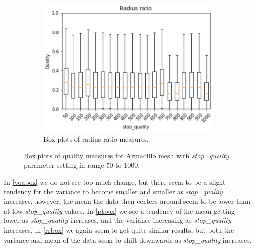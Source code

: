 \begin{figure}
\begin{subfigure}[b]{0.49\linewidth}
		\centering
		\includegraphics[width=\linewidth]{Materials/E1/rrbox}
		\caption{Box plots of radius ratio measures.}
		\label{rrbox}
	\end{subfigure}
	\caption{Box plots of quality measures for Armadillo mesh with \textit{stop\_quality} parameter setting in range 50 to 1000.}
	\label{boxplots}
\end{figure} 
In \autoref{voabox} we do not see too much change, but there seem to be a slight tendency for the variance to become smaller and smaller as \textit{stop\_quality} increases, however, the mean the data then centers around seem to be lower than at low \textit{stop\_quality} values. In \autoref{ptbox} we see a tendency of the mean getting lower as \textit{stop\_quality} increases, and the variance increasing as \textit{stop\_quality} increases. In \autoref{rrbox} we again seem to get quite similar results, but both the variance and mean of the data seem to shift downwards as \textit{stop\_quality} increases.
